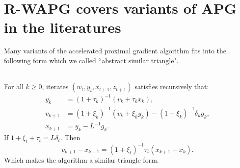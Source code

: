 \documentclass[12pt]{article}
\begin{document}
\section{R-WAPG covers variants of APG in the literatures}
    Many variants of the accelerated proximal gradient algorithm fits into the following form which we called ``abstract similar triangle". 
    \begin{proposition}\label{prop:abs-st-form}\;\\
        For all $k\ge 0$, iterates $(w_t, y_t, x_{t + 1}, z_{t + 1})$ satisfies recursively that: 
        \begin{align*}
            y_k &= (1 + \tau_k)^{-1}(v_k + \tau_k x_k),
            \\
            v_{k + 1} &= (1 + \xi_k)^{-1}(v_k + \xi_k y_k) - (1 + \xi_k)^{-1}\delta_k g_k,
            \\
            x_{k + 1} &= y_k - L^{-1} g_k. 
        \end{align*}
        If $1 + \xi_t + \tau_t = L\delta_t$. Then 
        $$
            v_{k + 1} - x_{k + 1} = (1 + \xi_t)^{-1}\tau_t(x_{k + 1} - x_k). 
        $$
        Which makes the algorithm a similar triangle form. 
    \end{proposition}
\end{document}
